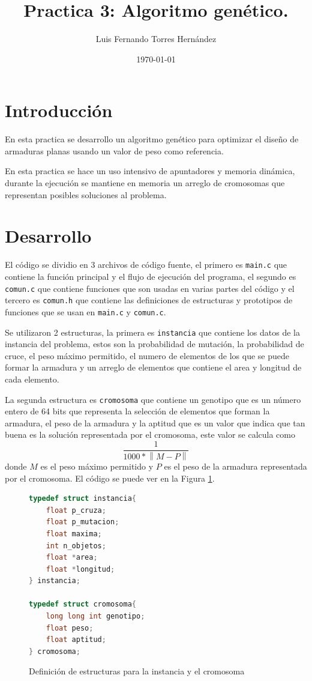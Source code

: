 \documentclass {article}
\author{Luis Fernando Torres Hernández}
\title{Practica 3: Algoritmo genético.}
\date{\today}
\begin{document}
\maketitle


\section {Introducción}
En esta practica se desarrollo un algoritmo genético para optimizar
el diseño de armaduras planas usando un valor de peso como referencia.

En esta practica se hace un uso intensivo de apuntadores y memoria
dinámica, durante la ejecución se mantiene en memoria un arreglo de
cromosomas que representan posibles soluciones al problema.


\section {Desarrollo}
El código se dividio en 3 archivos de código fuente, el primero es 
\texttt{main.c} que contiene la función principal y el flujo de ejecución 
del programa, el segundo es \texttt{comun.c} que contiene funciones que 
son usadas en varias partes del código y el tercero es \texttt{comun.h} que 
contiene las definiciones de estructuras y prototipos de funciones que se usan en
\texttt{main.c} y \texttt{comun.c}.

Se utilizaron 2 estructuras, la primera es \texttt{instancia} que contiene los datos
de la instancia del problema, estos son la probabilidad de mutación, la probabilidad 
de cruce, el peso máximo permitido, el numero de elementos de los que se puede formar
la armadura y un arreglo de elementos que contiene el area y longitud de cada elemento.

La segunda estructura es \texttt{cromosoma} que contiene un genotipo que es un número
entero de 64 bits que representa la selección de elementos que forman la armadura,
el peso de la armadura y la aptitud que es un valor que indica que tan buena es la 
solución representada por el cromosoma, este valor se calcula como 
$$ \frac{1}{1000 * \left\|M-P\right\|} $$
donde $M$ es el peso máximo permitido y $P$ es el peso de la armadura representada 
por el cromosoma. El código se puede ver en la Figura \ref{fig:structs}.

\begin{figure}[htbp]
    \centering
    \begin{lstlisting}[language=C]
typedef struct instancia{
    float p_cruza;
    float p_mutacion;
    float maxima;
    int n_objetos;
    float *area;
    float *longitud;
} instancia;

typedef struct cromosoma{
    long long int genotipo;
    float peso;
    float aptitud;
} cromosoma;
    \end{lstlisting}
    \caption{Definición de estructuras para la instancia y el cromosoma}
    \label{fig:structs}
        
\end{figure}
\end{document}
